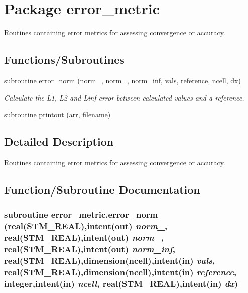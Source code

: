 \hypertarget{a00028}{
\section{Package error\_\-metric}
\label{a00028}
}
Routines containing error metrics for assessing convergence or accuracy.  


\subsection*{Functions/Subroutines}
\begin{CompactItemize}
\item 
subroutine \hyperlink{a00028_3b8a7158eb616a2bcccd5913ffc38017}{error\_\-norm} (norm\_, norm\_, norm\_\-inf, vals, reference, ncell, dx)
\begin{CompactList}\small\item\em Calculate the L1, L2 and Linf error between calculated values and a reference. \item\end{CompactList}\item 
subroutine \hyperlink{a00028_77cc70369d1c443b98ecf5a00f30f2ab}{printout} (arr, filename)
\end{CompactItemize}


\subsection{Detailed Description}
Routines containing error metrics for assessing convergence or accuracy. 



\subsection{Function/Subroutine Documentation}
\hypertarget{a00028_3b8a7158eb616a2bcccd5913ffc38017}{
\subsubsection[{error\_\-norm}]{\setlength{\rightskip}{0pt plus 5cm}subroutine error\_\-metric.error\_\-norm (real(STM\_\-REAL),intent(out) {\em norm\_}, \/  real(STM\_\-REAL),intent(out) {\em norm\_}, \/  real(STM\_\-REAL),intent(out) {\em norm\_\-inf}, \/  real(STM\_\-REAL),dimension(ncell),intent(in) {\em vals}, \/  real(STM\_\-REAL),dimension(ncell),intent(in) {\em reference}, \/  integer,intent(in) {\em ncell}, \/  real(STM\_\-REAL),intent(in) {\em dx})}}
\label{a00028_3b8a7158eb616a2bcccd5913ffc38017}


